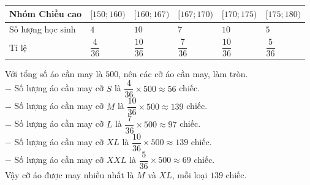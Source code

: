 \begin{ex}
{	\begin{center}
		\begin{tabular}{|>{\centering\arraybackslash}p{4cm}|>{\centering\arraybackslash}p{2cm}|>{\centering\arraybackslash}p{2cm}|>{\centering\arraybackslash}p{2cm}|>{\centering\arraybackslash}p{2cm}|>{\centering\arraybackslash}p{2cm}|}
			 \hline
			 Nhóm Chiều cao &$[150; 160)$&$[160; 167)$&$[167; 170)$&$[170; 175)$&$[175; 180)$\\
			 \hline
			Số lượng  học sinh&$4$&$10$&$7$&$10$&$5$\\
			 \hline
			 Tỉ lệ &$\dfrac{4}{36}$&$\dfrac{10}{36}$&$\dfrac{7}{36}$&$\dfrac{10}{36}$&$\dfrac{5}{36}$\\
			\hline 
		\end{tabular}
	\end{center}
	Với tổng số áo cần may là  $500$, nên các cỡ áo cần may, làm tròn.\\
	$-$ Số lượng áo cần may  cỡ $S$ là $\dfrac{4}{36} \times 500 \approx 56$ chiếc.\\
	$-$ Số lượng áo cần may cỡ $M$ là $\dfrac{10}{36}  \times 500 \approx 139$ chiếc.\\
	$-$ Số lượng áo cần may cỡ $L$ là  $\dfrac{7}{36} \times 500 \approx 97$ chiếc.\\
	$-$ Số  lượng áo cần may cỡ $XL$ là $\dfrac{10}{36} \times 500 \approx 139$ chiếc.\\
	$-$ Số lượng áo cần may cỡ $XXL$ là $\dfrac{5}{36} \times 500 \approx 69$  chiếc.\\
	Vậy cỡ áo được may nhiều nhất là $M$ và $XL$, mỗi loại $139$  chiếc.
} 
\end{ex}

